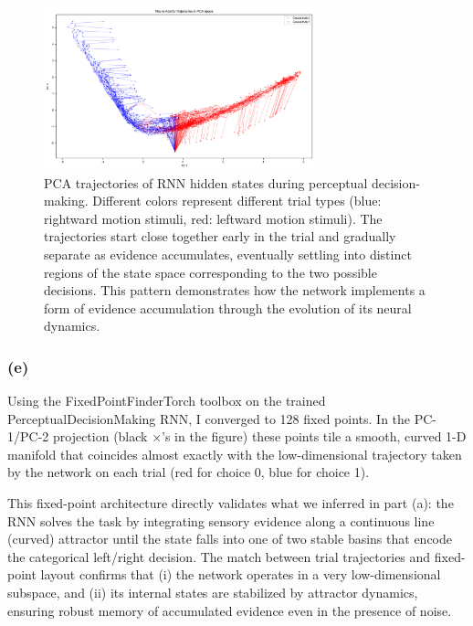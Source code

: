 \documentclass[11pt]{article}
\begin{document}
\begin{figure}[h]
\centering
\includegraphics[width=0.7\textwidth]{pca_trajectory.png}
\caption{PCA trajectories of RNN hidden states during perceptual decision-making. Different colors represent different trial types (blue: rightward motion stimuli, red: leftward motion stimuli). The trajectories start close together early in the trial and gradually separate as evidence accumulates, eventually settling into distinct regions of the state space corresponding to the two possible decisions. This pattern demonstrates how the network implements a form of evidence accumulation through the evolution of its neural dynamics.}
\label{fig:pca_trajectories}
\end{figure}

\pagebreak

\subsubsection*{(e)}
Using the FixedPointFinderTorch toolbox on the trained PerceptualDecisionMaking RNN, I converged to 128 fixed points. In the PC-1/PC-2 projection (black ×’s in the figure) these points tile a smooth, curved 1-D manifold that coincides almost exactly with the low-dimensional trajectory taken by the network on each trial (red for choice 0, blue for choice 1). 


This fixed-point architecture directly validates what we inferred in part (a): the RNN solves the task by integrating sensory evidence along a continuous line (curved) attractor until the state falls into one of two stable basins that encode the categorical left/right decision. The match between trial trajectories and fixed-point layout confirms that (i) the network operates in a very low-dimensional subspace, and (ii) its internal states are stabilized by attractor dynamics, ensuring robust memory of accumulated evidence even in the presence of noise.
\end{document}
